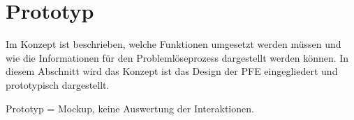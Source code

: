 \chapter{Prototyp}
\label{Prototyp}
Im Konzept ist beschrieben, welche Funktionen umgesetzt werden müssen und wie die Informationen für den Problemlöseprozess dargestellt werden können. In diesem Abschnitt wird das Konzept ist das Design der PFE eingegliedert und prototypisch dargestellt.

Prototyp = Mockup, keine Auswertung der Interaktionen.